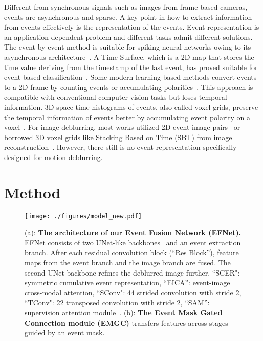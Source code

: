 \documentclass[runningheads]{llncs}
\newcommand{\PAR}[1]{\noindent{\bf #1}}
\newlength \g
\begin{document}
\PAR{Event representation.} Different from synchronous signals such as images from frame-based cameras, events are asynchronous and sparse. A key point in how to extract information from events effectively is the representation of the events. Event representation is an application-dependent problem and different tasks admit different solutions. The event-by-event method is suitable for spiking neural networks owing to its asynchronous architecture~\cite{snnref2,snnref3,snnref1}. A Time Surface, which is a 2D map that stores the time value deriving from the timestamp of the last event, has proved suitable for event-based classification~\cite{ahad2012motion,lagorce2016hots,sironi2018hats}.
Some modern learning-based methods convert events to a 2D frame by counting events or accumulating polarities~\cite{liu2018adaptive,maqueda2018event,shang2021bringing}. This approach is compatible with conventional computer vision tasks but loses temporal information. 3D space-time histograms of events, also called voxel grids, preserve the temporal information of events better by accumulating event polarity on a voxel~\cite{bardow2016simultaneous,zhu2019evflownet}. For image deblurring, most works utilized 2D event-image pairs~\cite{shang2021bringing} or borrowed 3D voxel grids like Stacking Based on Time (SBT) from image reconstruction~\cite{wang2019event}. However, there still is no event representation specifically designed for motion deblurring.


\section{Method}
\label{sec:method}

\begin{figure*}[tb]
\centering 
    \texttt{[image: ./figures/model\_new.pdf]}
    \vspace{-5mm}
    \caption{(a): \textbf{The architecture of our Event Fusion Network (EFNet).} EFNet consists of two UNet-like backbones~\cite{ronneberger2015u} and an event extraction branch. After each residual convolution block (``Res Block''), feature maps from the event branch and the image branch are fused. The second UNet backbone refines the deblurred image further. ``SCER": symmetric cumulative event representation, ``EICA'': event-image cross-modal attention, ``SConv": 44 strided convolution with stride 2, ``TConv": 22 transposed convolution with stride 2, ``SAM'': supervision attention module~\cite{zamir2021multi}. (b): \textbf{The Event Mask Gated Connection module (EMGC)} transfers features across stages guided by an event mask.}
    \vspace{-5mm}
    \label{fig:model}
\end{figure*}
\end{document}
